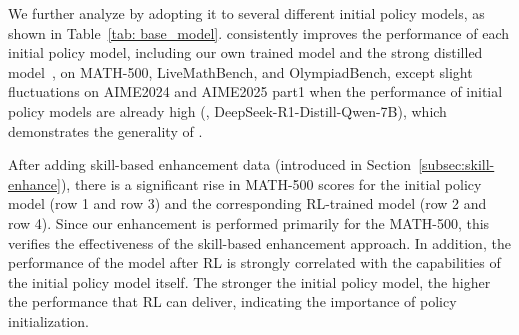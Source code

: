 

We further analyze \methodname{} by adopting it to several different initial policy models, as shown in Table~\ref{tab: base_model}. \methodname{} consistently improves the performance of each initial policy model, including our own trained model and the strong distilled model~\cite{deepseekr1}, on MATH-500, LiveMathBench, and OlympiadBench, except slight fluctuations on AIME2024 and AIME2025 part1 when the performance of initial policy models are already high (\eg, DeepSeek-R1-Distill-Qwen-7B), which demonstrates the generality of \methodname{}.

After adding skill-based enhancement data (introduced in Section~\ref{subsec:skill-enhance}), there is a significant rise in MATH-500 scores for the initial policy model (row 1 and row 3) and the corresponding RL-trained model (row 2 and row 4). 
Since our enhancement is performed primarily for the MATH-500, this verifies the effectiveness of the skill-based enhancement approach. In addition, the performance of the model after RL is strongly correlated with the capabilities of the initial policy model itself. 
The stronger the initial policy model, the higher the performance that RL can deliver, indicating the importance of policy initialization.
